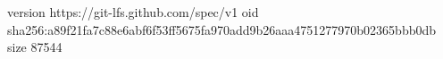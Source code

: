 version https://git-lfs.github.com/spec/v1
oid sha256:a89f21fa7c88e6abf6f53ff5675fa970add9b26aaa4751277970b02365bbb0db
size 87544
